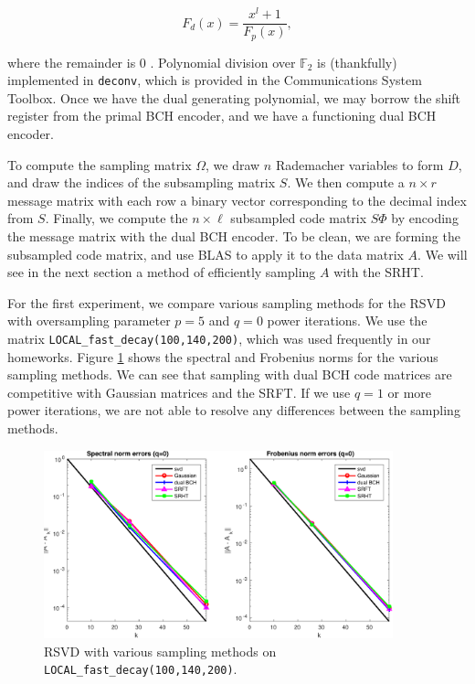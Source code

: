 \documentclass[12pt]{article}
\begin{document}
\[ F_d(x) = \dfrac{x^l+1}{F_p(x)}, \] 

\noindent where the remainder is $0$ \cite{hall2003notes}.  Polynomial division over $\mathbb{F}_2$ is (thankfully) implemented in \texttt{deconv}, which is provided in the Communications System Toolbox.  Once we have the dual generating polynomial, we may borrow the shift register from the primal BCH encoder, and we have a functioning dual BCH encoder.

To compute the sampling matrix $\Omega$, we draw $n$ Rademacher variables to form $D$, and draw the indices of the subsampling matrix $S$.  We then compute a $n\times r$ message matrix with each row a binary vector corresponding to the decimal index from $S$.  Finally, we compute the $n\times \ell$ subsampled code matrix $S\Phi$ by encoding the message matrix with the dual BCH encoder.  To be clean, we are forming the subsampled code matrix, and use BLAS to apply it to the data matrix $A$.  We will see in the next section a method of efficiently sampling $A$ with the SRHT.

For the first experiment, we compare various sampling methods for the RSVD with oversampling parameter $p=5$ and $q=0$ power iterations.  We use the matrix \verb|LOCAL_fast_decay(100,140,200)|, which was used frequently in our homeworks.  Figure \ref{fig:rsvd_compare_fast} shows the spectral and Frobenius norms for the various sampling methods.  We can see that sampling with dual BCH code matrices are competitive with Gaussian matrices and the SRFT.  If we use $q=1$ or more power iterations, we are not able to resolve any differences between the sampling methods.

\begin{figure}[h!]
   \centering
   \includegraphics[width=0.9\textwidth]{figures/fast_decay_rsvd_compare_trim.pdf}
   \caption{RSVD with various sampling methods on \texttt{LOCAL\_fast\_decay(100,140,200)}.}
   \label{fig:rsvd_compare_fast}
\end{figure}
\end{document}
